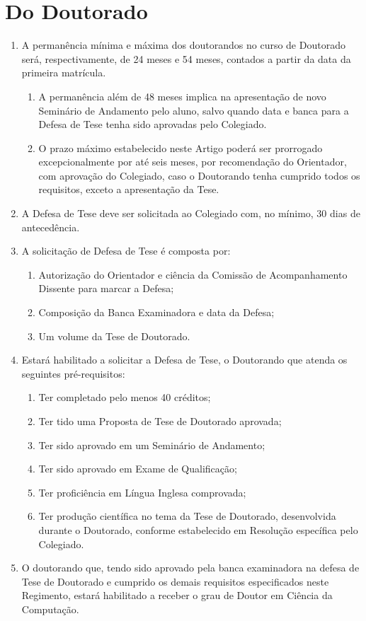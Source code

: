 \documentclass{article}
\newcommand{\grupoMenor}{Colegiado\xspace}
\begin{document}
\section{Do Doutorado}
\begin{enumerate}
	\item  A permanência mínima e máxima dos doutorandos no curso de Doutorado será, respectivamente, de 24 meses e 54 meses, contados a partir da data da primeira matrícula.
	\begin{enumerate}
		\item A permanência além de 48 meses implica na apresentação de novo Seminário de Andamento pelo aluno, salvo quando data e banca para a Defesa de Tese tenha sido aprovadas pelo \grupoMenor.	
		\item O prazo máximo estabelecido neste Artigo poderá ser prorrogado excepcionalmente por até seis meses, por recomendação do Orientador, com aprovação do \grupoMenor, caso o Doutorando tenha cumprido todos os requisitos, exceto a apresentação da Tese.
	\end{enumerate}
	
	\item A Defesa de Tese deve ser solicitada ao \grupoMenor com, no mínimo, 30 dias de antecedência. 
	\item A solicitação de Defesa de Tese é composta por:
	\begin{enumerate}[label=\Roman*]
        \item Autorização do Orientador e ciência da Comissão de Acompanhamento Dissente para marcar a Defesa;
        \item Composição da Banca Examinadora e data da Defesa;
        \item Um volume da Tese de Doutorado.
    \end{enumerate}
	\item Estará habilitado a solicitar a Defesa de Tese, o Doutorando que atenda os seguintes pré-requisitos:
	\begin{enumerate}[label=\Roman*]
		\item	Ter completado pelo menos 40 créditos;
		\item	Ter tido uma Proposta de Tese de Doutorado aprovada;
		\item	Ter sido aprovado em um Seminário de Andamento;
		\item	Ter sido aprovado em Exame de Qualificação;
		\item 	Ter proficiência em Língua Inglesa comprovada;
		\item	Ter produção científica no tema da Tese de Doutorado, desenvolvida durante o Doutorado, conforme estabelecido em Resolução específica pelo \grupoMenor.
	\end{enumerate}

	\item  O doutorando que, tendo sido aprovado pela banca examinadora na defesa de Tese de Doutorado e cumprido os demais requisitos especificados neste Regimento, estará habilitado a receber o grau de Doutor em Ciência da Computação.
\end{enumerate}
\end{document}
